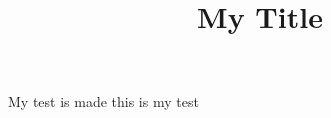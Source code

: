 \documentclass{article}
\title{My Title}
\begin{document}
\maketitle
My test is made
this is my test
\end{document}
